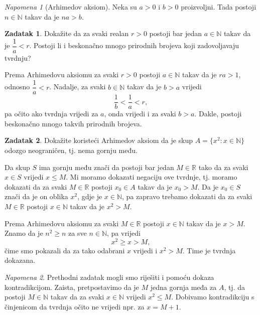\documentclass{book}
\renewenvironment{proof}{%
    \vspace{-\parskip}\begin{oldproof}%
    }{%
    \end{oldproof}%
}
\theoremstyle{definition}
\theoremstyle{definition}
\newtheorem{exercise}{Zadatak}
\theoremstyle{remark}
\newtheorem{remark}{Napomena}
\begin{document}
\begin{remark}[Arhimedov aksiom]
Neka su $a>0$ i $b>0$ proizvoljni. Tada postoji $n\in \mathbb{N}$ takav da je $na>b$.
\end{remark}
\begin{exercise}
Dokažite da za svaki realan $r>0$ postoji bar jedan $a\in \mathbb{N}$ takav da je $\dfrac{1}{a}<r$. Postoji li i beskonačno mnogo prirodnih brojeva koji zadovoljavaju tvrdnju?
\end{exercise}
\begin{proof}[Rješenje]
Prema Arhimedovu aksiomu za svaki $r>0$ postoji $a\in \mathbb{N}$ takav da je $ra>1$, odnosno $\dfrac{1}{a}<r$. Nadalje, za svaki $b\in \mathbb{N}$ takav da je $b>a$ vrijedi $$\dfrac{1}{b}<\dfrac{1}{a}<r,$$ pa očito ako tvrdnja vrijedi za $a$, onda vrijedi i za svaki $b>a$. Dakle, postoji beskonačno mnogo takvih prirodnih brojeva.
\end{proof}
\begin{exercise}
\label{12}
Dokažite koristeći Arhimedov aksiom da je skup $A=\{x^2 : x\in \mathbb{N}\}$ odozgo neograničen, tj. nema gornju među.
\end{exercise}
\begin{proof}[Rješenje]
Da skup $S$ ima gornju među znači da postoji bar jedan $M\in \mathbb{R}$ tako da za svaki $x\in S$ vrijedi $x\leq M$. Mi moramo dokazati negaciju ove tvrdnje, tj. moramo dokazati da za svaki $M\in \mathbb{R}$ postoji $x_0\in A$ takav da je $x_0>M$. Da je $x_0\in S$ znači da je on oblika $x^2$, gdje je $x\in \mathbb{N}$, pa zapravo trebamo dokazati da za svaki $M\in \mathbb{R}$ postoji $x\in \mathbb{N}$ takav da je $x^2>M$. 

Prema Arhimedovu aksiomu za svaki $M\in \mathbb{R}$ postoji $x\in \mathbb{N}$ takav da je $x>M$. Znamo da je $n^2\geq n$ za sve $n\in \mathbb{N}$, pa vrijedi $$x^2\geq x>M,$$ 
čime smo pokazali da za tako odabrani $x$ vrijedi i $x^2>M$. Time je tvrdnja dokazana.
\end{proof}
\begin{remark}
Prethodni zadatak mogli smo riješiti i pomoću dokaza kontradikcijom. Zaista, pretpostavimo da je $M$ jedna gornja međa za $A$, tj. da postoji $M\in \mathbb{N}$ takav da za svaki $x\in \mathbb{N}$ vrijedi $x^2\leq M$. Dobivamo kontradikciju s činjenicom da tvrdnja očito ne vrijedi npr. za $x=M+1$.
\end{remark}
\end{document}
